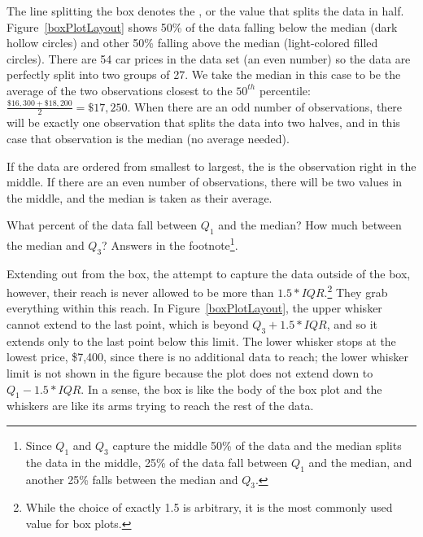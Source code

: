 The line splitting the box denotes the , or the value that splits the data in half. Figure~\ref{boxPlotLayout} shows 50\% of the data falling below the median (dark hollow circles) and other 50\% falling above the median (light-colored filled circles). There are 54 car prices in the data set (an even number) so the data are perfectly split into two groups of 27. We take the median in this case to be the average of the two observations closest to the $50^{th}$ percentile: $\frac{\$16,300 + \$18,200}{2} = \$17,250$. When there are an odd number of observations, there will be exactly one observation that splits the data into two halves, and in this case that observation is the median (no average needed).



\begin{termBox}{
If the data are ordered from smallest to largest, the  is the observation right in the middle. If there are an even number of observations, there will be two values in the middle, and the median is taken as their average.}
\end{termBox}

\begin{exercise}
What percent of the data fall between $Q_1$ and the median? How much between the median and $Q_3$? Answers in the footnote\footnote{Since $Q_1$ and $Q_3$ capture the middle 50\% of the data and the median splits the data in the middle, 25\% of the data fall between $Q_1$ and the median, and another 25\% falls between the median and $Q_3$.}.
\end{exercise}

Extending out from the box, the  attempt to capture the data outside of the box, however, their reach is never allowed to be more than $1.5*IQR$.\footnote{While the choice of exactly 1.5 is arbitrary, it is the most commonly used value for box plots.} They grab everything within this reach. In Figure~\ref{boxPlotLayout}, the upper whisker cannot extend to the last point, which is beyond $Q_3 + 1.5*IQR$, and so it extends only to the last point below this limit. The lower whisker stops at the lowest price, \$7,400, since there is no additional data to reach; the lower whisker limit is not shown in the figure because the plot does not extend down to $Q_1 - 1.5*IQR$. In a sense, the box is like the body of the box plot and the whiskers are like its arms trying to reach the rest of the data.

